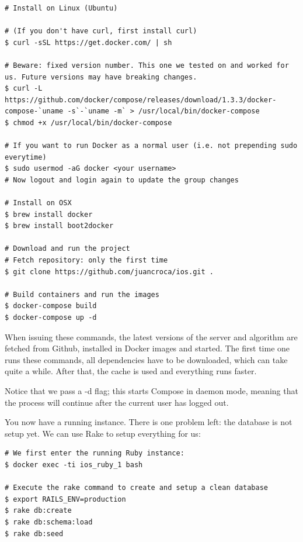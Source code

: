 \begin{verbatim}
# Install on Linux (Ubuntu)

# (If you don't have curl, first install curl)
$ curl -sSL https://get.docker.com/ | sh

# Beware: fixed version number. This one we tested on and worked for us. Future versions may have breaking changes.
$ curl -L https://github.com/docker/compose/releases/download/1.3.3/docker-compose-`uname -s`-`uname -m` > /usr/local/bin/docker-compose 
$ chmod +x /usr/local/bin/docker-compose

# If you want to run Docker as a normal user (i.e. not prepending sudo everytime)
$ sudo usermod -aG docker <your username>
# Now logout and login again to update the group changes

# Install on OSX
$ brew install docker
$ brew install boot2docker

# Download and run the project
# Fetch repository: only the first time
$ git clone https://github.com/juancroca/ios.git .

# Build containers and run the images
$ docker-compose build
$ docker-compose up -d
\end{verbatim}


When issuing these commands, the latest versions of the server and algorithm are fetched from Github, installed in Docker images and started. The first time one runs these commands, all dependencies have to be downloaded, which can take quite a while. After that, the cache is used and everything runs faster.

Notice that we pass a -d flag; this starts Compose in daemon mode, meaning that the process will continue after the current user has logged out.

You now have a running instance. There is one problem left: the database is not setup yet. We can use Rake to setup everything for us:

\begin{verbatim}
# We first enter the running Ruby instance:
$ docker exec -ti ios_ruby_1 bash

# Execute the rake command to create and setup a clean database
$ export RAILS_ENV=production
$ rake db:create
$ rake db:schema:load
$ rake db:seed
\end{verbatim}

